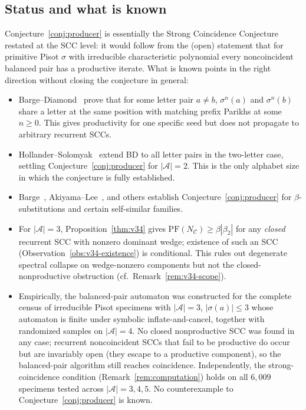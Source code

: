 \documentclass[11pt]{article}
\theoremstyle{plain}
\theoremstyle{definition}
\theoremstyle{remark}
\newcommand{\A}{\mathcal{A}}
\newcommand{\C}{\mathcal{C}}
\newcommand{\PFroot}{\mathrm{PF}}
\begin{document}
\subsection{Status and what is known}\label{sec:status-known}

Conjecture~\ref{conj:producer} is essentially the Strong Coincidence Conjecture restated at the SCC level: it would follow from the (open) statement that for primitive Pisot $\sigma$ with irreducible characteristic polynomial every noncoincident balanced pair has a productive iterate. What is known points in the right direction without closing the conjecture in general:
\begin{itemize}[leftmargin=*]
\item Barge--Diamond~\cite{BD} prove that for some letter pair $a\ne b$, $\sigma^n(a)$ and $\sigma^n(b)$ share a letter at the same position with matching prefix Parikhs at some $n\ge 0$. This gives productivity for one specific seed but does not propagate to arbitrary recurrent SCCs.
\item Hollander--Solomyak~\cite{HS} extend BD to all letter pairs in the two-letter case, settling Conjecture~\ref{conj:producer} for $|\A|=2$. This is the only alphabet size in which the conjecture is fully established.
\item Barge~\cite{Barge2018}, Akiyama--Lee~\cite{AL}, and others establish Conjecture~\ref{conj:producer} for $\beta$-substitutions and certain self-similar families.
\item For $|\A|=3$, Proposition~\ref{thm:v34} gives $\PFroot(N_\C)\ge\beta|\beta_2|$ for any \emph{closed} recurrent SCC with nonzero dominant wedge; existence of such an SCC (Observation~\ref{obs:v34-existence}) is conditional. This rules out degenerate spectral collapse on wedge-nonzero components but not the closed-nonproductive obstruction (cf.\ Remark~\ref{rem:v34-scope}).
\item Empirically, the balanced-pair automaton was constructed for the complete census of irreducible Pisot specimens with $|\A|=3$, $|\sigma(a)|\le 3$ whose automaton is finite under symbolic inflate-and-cancel, together with randomized samples on $|\A|=4$. No closed nonproductive SCC was found in any case; recurrent noncoincident SCCs that fail to be productive do occur but are invariably open (they escape to a productive component), so the balanced-pair algorithm still reaches coincidence. Independently, the strong-coincidence condition (Remark~\ref{rem:computation}) holds on all $6{,}009$ specimens tested across $|\A|=3,4,5$. No counterexample to Conjecture~\ref{conj:producer} is known.

\end{itemize}
\end{document}
